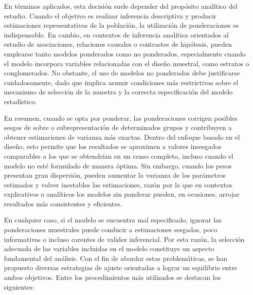 \documentclass[
  spanish,
  12pt,
]{book}
\begin{document}
En términos aplicados, esta decisión suele depender del propósito analítico del estudio. Cuando el objetivo es realizar inferencia descriptiva y producir estimaciones representativas de la población, la utilización de ponderaciones es indispensable. En cambio, en contextos de inferencia analítica orientados al estudio de asociaciones, relaciones causales o contrastes de hipótesis, pueden emplearse tanto modelos ponderados como no ponderados, especialmente cuando el modelo incorpora variables relacionadas con el diseño muestral, como estratos o conglomerados. No obstante, el uso de modelos no ponderados debe justificarse cuidadosamente, dado que implica asumir condiciones más restrictivas sobre el mecanismo de selección de la muestra y la correcta especificación del modelo estadístico.

En resumen, cuando se opta por ponderar, las ponderaciones corrigen posibles sesgos de sobre o subrepresentación de determinados grupos y contribuyen a obtener estimaciones de varianza más exactas. Dentro del enfoque basado en el diseño, esto permite que los resultados se aproximen a valores insesgados comparables a los que se obtendrían en un censo completo, incluso cuando el modelo no esté formulado de manera óptima. Sin embargo, cuando los pesos presentan gran dispersión, pueden aumentar la varianza de los parámetros estimados y volver inestables las estimaciones, razón por la que en contextos explicativos o analíticos los modelos sin ponderar pueden, en ocasiones, arrojar resultados más consistentes y eficientes.

En cualquier caso, si el modelo se encuentra mal especificado, ignorar las ponderaciones muestrales puede conducir a estimaciones sesgadas, poco informativas o incluso carentes de validez inferencial. Por esta razón, la selección adecuada de las variables incluidas en el modelo constituye un aspecto fundamental del análisis. Con el fin de abordar estas problemáticas, se han propuesto diversas estrategias de ajuste orientadas a lograr un equilibrio entre ambos objetivos. Entre los procedimientos más utilizados se destacan los siguientes:
\end{document}
